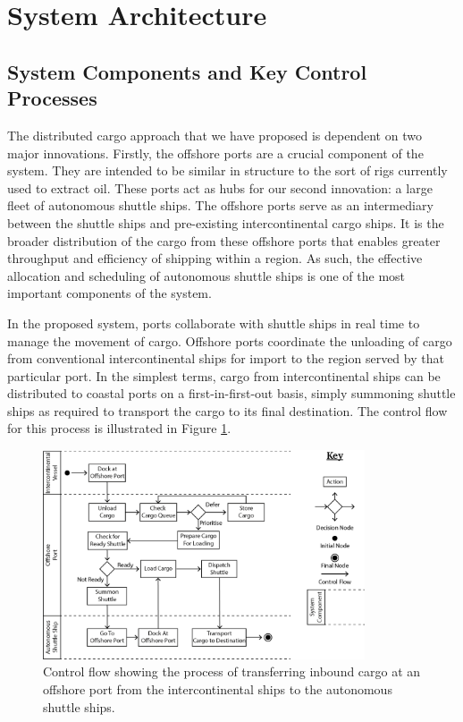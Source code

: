 \newpage
\section{System Architecture}
\label{sec:system_architecture}

\subsection{System Components and Key Control Processes}
The distributed cargo approach that we have proposed is dependent on two major innovations. Firstly, the offshore ports are a crucial component of the system. They are intended to be similar in structure to the sort of rigs currently used to extract oil. These ports act as hubs for our second innovation: a large fleet of autonomous shuttle ships. The offshore ports serve as an intermediary between the shuttle ships and pre-existing intercontinental cargo ships. It is the broader distribution of the cargo from these offshore ports that enables greater throughput and efficiency of shipping within a region. As such, the effective allocation and scheduling of autonomous shuttle ships is one of the most important components of the system.

In the proposed system, ports collaborate with shuttle ships in real time to manage the movement of cargo. Offshore ports coordinate the unloading of cargo from conventional intercontinental ships for import to the region served by that particular port. In the simplest terms, cargo from intercontinental ships can be distributed to coastal ports on a first-in-first-out basis, simply summoning shuttle ships as required to transport the cargo to its final destination. The control flow for this process is illustrated in Figure \ref{fig:arch_1}.

\begin{figure}[h!]
\centering
	\includegraphics[width=0.85\textwidth]{images/arch_1}
	\caption{Control flow showing the process of transferring inbound cargo at an offshore port from the intercontinental ships to the autonomous shuttle ships.} 
	\label{fig:arch_1}
\end{figure}

